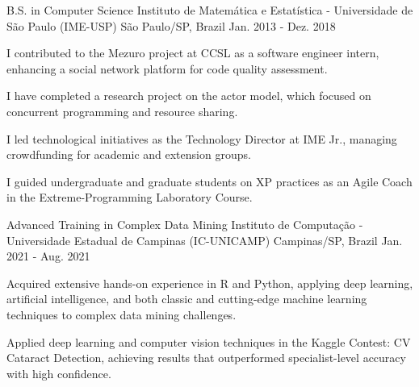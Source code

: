 

\begin{cventries}

  \cventry
    {B.S. in Computer Science} %
    {Instituto de Matemática e Estatística - Universidade de São Paulo (IME-USP)} %
    {São Paulo/SP, Brazil} %
    {Jan. 2013 - Dez. 2018} %
    {
      \begin{cvitems} %
        \item {I contributed to the Mezuro project at CCSL as a software engineer intern, enhancing a social network platform for code quality assessment.}
        \item {I have completed a research project on the actor model, which focused on concurrent programming and resource sharing.}
        \item {I led technological initiatives as the Technology Director at IME Jr., managing crowdfunding for academic and extension groups.}
        \item {I guided undergraduate and graduate students on XP practices as an Agile Coach in the Extreme-Programming Laboratory Course.}
      \end{cvitems}
    }
  \newline
  \cventry
    {Advanced Training in Complex Data Mining} %
    {Instituto de Computação - Universidade Estadual de Campinas (IC-UNICAMP)} %
    {Campinas/SP, Brazil} %
    {Jan. 2021 - Aug. 2021} %
    {
      \begin{cvitems} %
        \item {Acquired extensive hands-on experience in R and Python, applying deep learning, artificial intelligence, and both classic and cutting-edge machine learning techniques to complex data mining challenges.}
        \item {Applied deep learning and computer vision techniques in the Kaggle Contest: CV Cataract Detection, achieving results that outperformed specialist-level accuracy with high confidence.}
      \end{cvitems}
}
\end{cventries}
